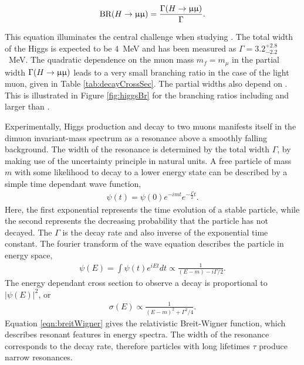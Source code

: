 \begin{equation}\begin{split}
    \text{BR}(H\to\upmu\upmu)=\frac{\Gamma(H\to\upmu\upmu)}{\Gamma}.
\end{split}\end{equation} 

This equation illuminates the central challenge when studying \hmm. 
The total width of the Higgs is expected to be $4$~MeV and has been measured as $\Gamma=3.2^{+2.8}_{-2.2}$~MeV. \cite{cmsWidth}
The quadratic dependence on the muon mass $m_f=m_\mu$ in the partial width $\Gamma(H\to\upmu\upmu)$ leads to a very small branching ratio in the case of the light muon, given in Table \ref{tab:decayCrossSec}.
The partial widths also depend on \mh. This is illustrated in Figure \ref{fig:higgsBr} for the branching ratios including and larger than \hmm.

Experimentally, Higgs production and decay to two muons manifests itself in the dimuon invariant-mass spectrum as a resonance above a smoothly falling background.
The width of the resonance is determined by the total width $\Gamma$, by making use of the uncertainty principle in natural units.
A free particle of mass $m$ with some likelihood to decay to a lower energy state can be described by a simple time dependant wave function,
\begin{equation}\begin{split}
    \psi(t)=\psi(0)e^{-imt}e^{-\frac{\Gamma}{2}t}.
\end{split}\end{equation} 
Here, the first exponential represents the time evolution of a stable particle, while the second represents the decreasing probability that the particle has not decayed.
The $\Gamma$ is the decay rate and also inverse of the exponential time constant.
The fourier transform of the wave equation describes the particle in energy space,
\begin{equation}\begin{split}
    \psi(E)=\int\psi(t)e^{iEt}dt\propto \frac{1}{(E-m)-i\Gamma/2}.
\end{split}\end{equation}
The energy dependant cross section to observe a decay is proportional to $|\psi(E)|^2$, or 
\begin{equation}\begin{split}\label{eqn:breitWigner}
    \sigma(E)\propto\frac{1}{(E-m)^2+\Gamma^2/4}.
\end{split}\end{equation} 
Equation \ref{eqn:breitWigner} gives the relativistic Breit-Wigner function, which describes resonant features in energy spectra.
The width of the resonance corresponds to the decay rate, therefore particles with long lifetimes $\tau$ produce narrow resonances.

